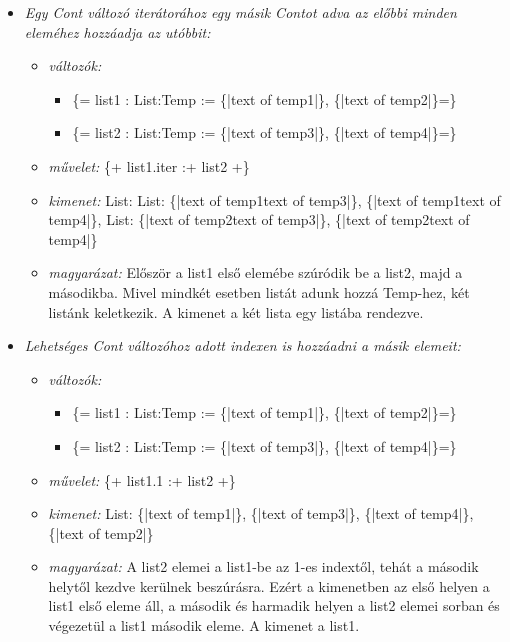 {\begin{itemize}
\item \emph{ Egy Cont változó iterátorához egy másik Contot adva az előbbi minden eleméhez hozzáadja az utóbbit:}
\begin{itemize}
\item \emph{változók:}
\begin{itemize}
\item \{= list1 : List:Temp  := \{|text of temp1|\}, \{|text of temp2|\}=\}
\item \{= list2 : List:Temp  := \{|text of temp3|\}, \{|text of temp4|\}=\}
\end{itemize}
\item \emph{művelet:}
\{+ list1.iter :+ list2 +\}
\item \emph{kimenet:}
List: List: \{|text of temp1text of temp3|\}, \{|text of temp1text of temp4|\}, List: \{|text of temp2text of temp3|\}, \{|text of temp2text of temp4|\}
\item \emph{magyarázat:}
Először a list1 első elemébe szúródik be a list2, majd a másodikba.
Mivel mindkét esetben listát adunk hozzá Temp-hez, két listánk keletkezik.
A kimenet a két lista egy listába rendezve.
\end{itemize}

\item \emph{ Lehetséges Cont változóhoz adott indexen is hozzáadni a másik elemeit:}
\begin{itemize}
\item \emph{változók:}
\begin{itemize}
\item \{= list1 : List:Temp  := \{|text of temp1|\}, \{|text of temp2|\}=\}
\item \{= list2 : List:Temp  := \{|text of temp3|\}, \{|text of temp4|\}=\}
\end{itemize}
\item \emph{művelet:}
\{+ list1.1 :+ list2 +\}
\item \emph{kimenet:}
List: \{|text of temp1|\}, \{|text of temp3|\}, \{|text of temp4|\}, \{|text of temp2|\}
\item \emph{magyarázat:}
A list2 elemei a list1-be az 1-es indextől, tehát a második helytől kezdve kerülnek beszúrásra.
Ezért a kimenetben az első helyen a list1 első eleme áll, a második és harmadik helyen a list2 elemei sorban és végezetül a list1 második eleme.
A kimenet a list1.
\end{itemize}


\end{itemize}}
